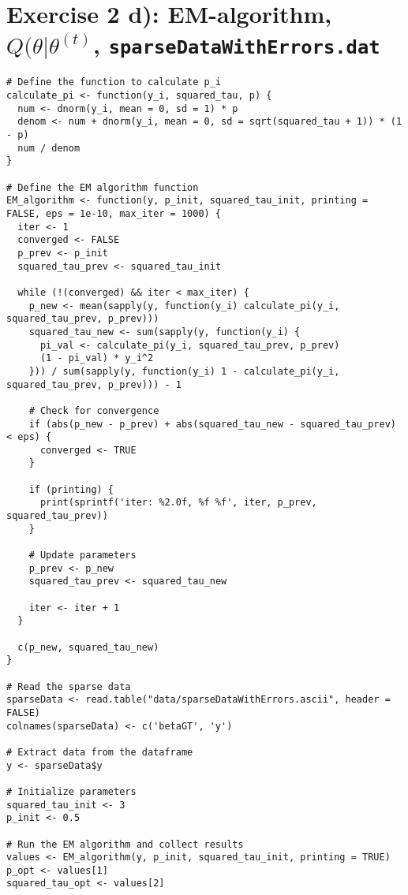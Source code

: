 \vspace{15mm}
\section*{Exercise 2 d): EM-algorithm, $Q(\theta|\theta^(t)$, \texttt{sparseDataWithErrors.dat}}
\begin{tcolorbox}[colback=white!95!black,colframe=white!50!black, breakable]
\begin{lstlisting}[caption={Exercise 2d}, label={lst:EM-alg}]
# Define the function to calculate p_i
calculate_pi <- function(y_i, squared_tau, p) {
  num <- dnorm(y_i, mean = 0, sd = 1) * p
  denom <- num + dnorm(y_i, mean = 0, sd = sqrt(squared_tau + 1)) * (1 - p)
  num / denom
}

# Define the EM algorithm function
EM_algorithm <- function(y, p_init, squared_tau_init, printing = FALSE, eps = 1e-10, max_iter = 1000) {
  iter <- 1
  converged <- FALSE
  p_prev <- p_init
  squared_tau_prev <- squared_tau_init
  
  while (!(converged) && iter < max_iter) {
    p_new <- mean(sapply(y, function(y_i) calculate_pi(y_i, squared_tau_prev, p_prev)))
    squared_tau_new <- sum(sapply(y, function(y_i) {
      pi_val <- calculate_pi(y_i, squared_tau_prev, p_prev)
      (1 - pi_val) * y_i^2
    })) / sum(sapply(y, function(y_i) 1 - calculate_pi(y_i, squared_tau_prev, p_prev))) - 1
    
    # Check for convergence
    if (abs(p_new - p_prev) + abs(squared_tau_new - squared_tau_prev) < eps) {
      converged <- TRUE
    }
    
    if (printing) {
      print(sprintf('iter: %2.0f, %f %f', iter, p_prev, squared_tau_prev))
    }
    
    # Update parameters
    p_prev <- p_new
    squared_tau_prev <- squared_tau_new
    
    iter <- iter + 1
  }
  
  c(p_new, squared_tau_new)
}

# Read the sparse data
sparseData <- read.table("data/sparseDataWithErrors.ascii", header = FALSE)
colnames(sparseData) <- c('betaGT', 'y')

# Extract data from the dataframe
y <- sparseData$y

# Initialize parameters
squared_tau_init <- 3
p_init <- 0.5

# Run the EM algorithm and collect results
values <- EM_algorithm(y, p_init, squared_tau_init, printing = TRUE)
p_opt <- values[1]
squared_tau_opt <- values[2]
\end{lstlisting}
\end{tcolorbox}
\vspace{15mm}
